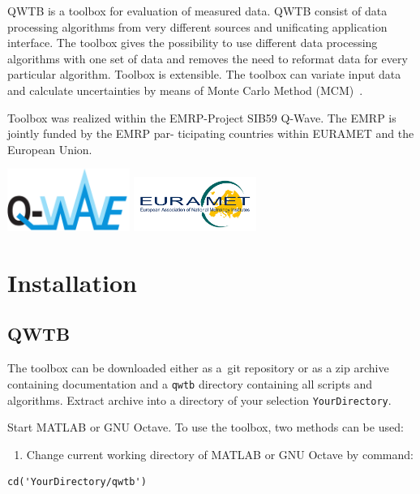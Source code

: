 \documentclass[12pt,a4paper,oneside]{report} %
\def\matlab{{\sc MATLAB}\xspace}
\def\octave{{\sc GNU Octave}\xspace}
\begin{document}
\bigskip
\noindent QWTB is a toolbox for evaluation of measured data. QWTB consist of data
processing algorithms from very different sources and unificating application interface. The toolbox
gives the possibility to use different data processing algorithms with one set of data and removes
the need to reformat data for every particular algorithm. Toolbox is extensible. The toolbox
can variate input data and calculate uncertainties by means of Monte Carlo Method
(MCM)~\cite{JCGM2008}.

Toolbox was realized within the EMRP-Project SIB59 Q-Wave. The EMRP is jointly funded by the EMRP
par- ticipating countries within EURAMET and the European Union.

\vfill
\includegraphics[width=0.3\textwidth]{sources/Q-Wave_logo_01.pdf}
\hfill
\includegraphics[width=0.3\textwidth]{sources/eurametlogo.jpg}


\chapter{Installation} %
\section{QWTB} %
The toolbox can be downloaded either as a~{\sc git} repository or as a zip archive containing
documentation and a {\tt qwtb} directory containing all scripts and algorithms. Extract
archive into a directory of your selection {\tt YourDirectory}.

Start \matlab or \octave. To use the toolbox, two methods can be used:
\begin{enumerate}
        \item Change current working directory of \matlab or \octave by command:
\end{enumerate}

\begin{lstlisting}
cd('YourDirectory/qwtb')
\end{lstlisting}
\end{document}
